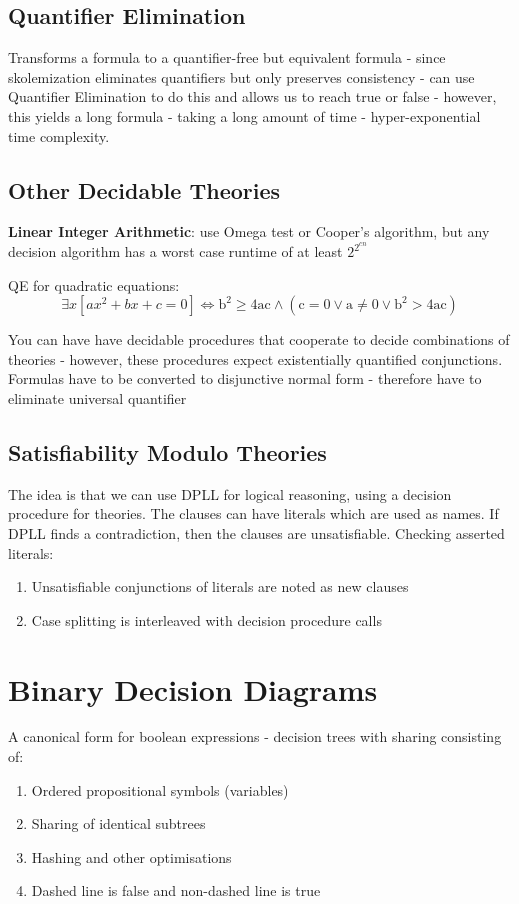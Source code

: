 \documentclass{article}
\begin{document}
\subsection{Quantifier Elimination}
Transforms a formula to a quantifier-free but equivalent formula - since skolemization eliminates quantifiers but only preserves consistency - can use Quantifier Elimination to do this and allows us to reach true or false - however, this yields a long formula - taking a long amount of time - hyper-exponential time complexity.

\subsection{Other Decidable Theories}
\textbf{Linear Integer Arithmetic}: use Omega test or Cooper's algorithm, but any decision algorithm has a worst case runtime of at least $2^{2^{cn}}$

\bigskip
\noindent
QE for quadratic equations:
$$\exists x\left[a x^{2}+b x+c=0\right] \Longleftrightarrow \mathrm{b}^{2} \geq 4 \mathrm{ac} \wedge\left(\mathrm{c}=0 \vee \mathrm{a} \neq 0 \vee \mathrm{b}^{2}>4 \mathrm{ac}\right) $$

You can have have decidable procedures that cooperate to decide combinations of theories - however, these procedures expect existentially quantified conjunctions. Formulas have to be converted to disjunctive normal form - therefore have to eliminate universal quantifier

\subsection{Satisfiability Modulo Theories}
The idea is that we can use DPLL for logical reasoning, using a decision procedure for theories. The clauses can have literals which are used as names. If DPLL finds a contradiction, then the clauses are unsatisfiable. Checking asserted literals:
\begin{enumerate}
    \item Unsatisfiable conjunctions of literals are noted as new clauses
    \item Case splitting is interleaved with decision procedure calls
\end{enumerate}

\section{Binary Decision Diagrams}
A canonical form for boolean expressions - decision trees with sharing consisting of:
\begin{enumerate}
    \item Ordered propositional symbols (variables)
    \item Sharing of identical subtrees
    \item Hashing and other optimisations
    \item Dashed line is false and non-dashed line is true
\end{enumerate}
\end{document}
